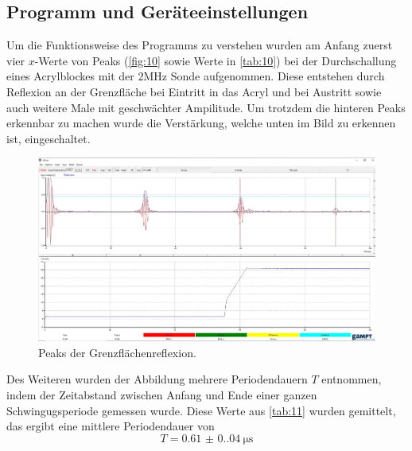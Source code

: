 \subsection{Programm und Geräteeinstellungen}
Um die Funktionsweise des Programms zu verstehen wurden am Anfang 
zuerst vier $x$-Werte von Peaks (\autoref{fig:10} sowie Werte in \autoref{tab:10})
bei der Durchschallung eines Acrylblockes mit der $2 \unit{\mega\hertz}$ Sonde
aufgenommen. Diese entstehen durch Reflexion an der Grenzfläche bei Eintritt in
das Acryl und bei Austritt sowie auch weitere Male mit geschwächter Ampilitude.
Um trotzdem die hinteren Peaks erkennbar zu machen wurde die Verstärkung,
welche unten im Bild zu erkennen ist, eingeschaltet.
\begin{figure}[H]
    \centering
    \caption{Peaks der Grenzflächenreflexion.}
    \label{fig:10}
    \includegraphics[width=\textwidth]{bilder/ssprogramm.jpg}
\end{figure}
\noindent Des Weiteren wurden der Abbildung mehrere Periodendauern $T$ entnommen, indem 
der Zeitabstand zwischen Anfang und Ende einer ganzen Schwingugsperiode 
gemessen wurde. Diese Werte aus \autoref{tab:11} wurden gemittelt, das
ergibt eine mittlere Periodendauer von 
\begin{equation}
   T = \qty{0.61(0.04)}{\micro\second}
\end{equation}

